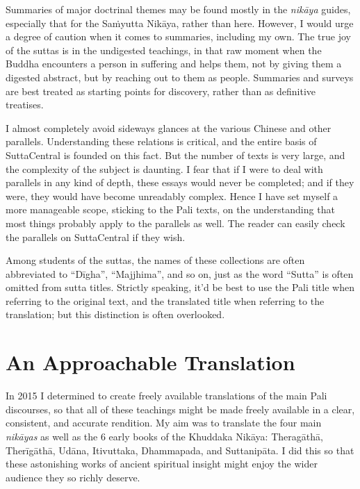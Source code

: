 \documentclass[12pt,openany]{book}%
\begin{document}
Summaries of major doctrinal themes may be found mostly in the \textit{\textsanskrit{nikāya}} guides, especially that for the \textsanskrit{Saṁyutta} \textsanskrit{Nikāya}, rather than here. However, I would urge a degree of caution when it comes to summaries, including my own. The true joy of the suttas is in the undigested teachings, in that raw moment when the Buddha encounters a person in suffering and helps them, not by giving them a digested abstract, but by reaching out to them as people. Summaries and surveys are best treated as starting points for discovery, rather than as definitive treatises.

I almost completely avoid sideways glances at the various Chinese and other parallels. Understanding these relations is critical, and the entire basis of SuttaCentral is founded on this fact. But the number of texts is very large, and the complexity of the subject is daunting. I fear that if I were to deal with parallels in any kind of depth, these essays would never be completed; and if they were, they would have become unreadably complex. Hence I have set myself a more manageable scope, sticking to the Pali texts, on the understanding that most things probably apply to the parallels as well. The reader can easily check the parallels on SuttaCentral if they wish.

Among students of the suttas, the names of these collections are often abbreviated to “\textsanskrit{Dīgha}”, “Majjhima”, and so on, just as the word “Sutta” is often omitted from sutta titles. Strictly speaking, it’d be best to use the Pali title when referring to the original text, and the translated title when referring to the translation; but this distinction is often overlooked.

\section*{An Approachable Translation}

In 2015 I determined to create freely available translations of the main Pali discourses, so that all of these teachings might be made freely available in a clear, consistent, and accurate rendition. My aim was to translate the four main \textit{\textsanskrit{nikāyas}} as well as the 6 early books of the Khuddaka \textsanskrit{Nikāya}: \textsanskrit{Theragāthā}, \textsanskrit{Therīgāthā}, \textsanskrit{Udāna}, Itivuttaka, Dhammapada, and \textsanskrit{Suttanipāta}. I did this so that these astonishing works of ancient spiritual insight might enjoy the wider audience they so richly deserve.
\end{document}
